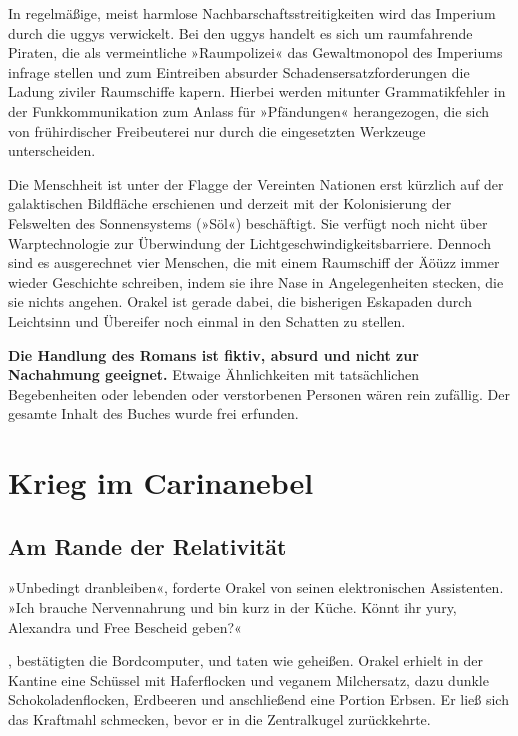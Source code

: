 In regelmäßige, meist harmlose Nachbarschaftsstreitigkeiten wird das Imperium durch die uggys verwickelt. Bei den uggys handelt es sich um raumfahrende Piraten, die als vermeintliche »Raumpolizei« das Gewaltmonopol des Imperiums infrage stellen und zum Eintreiben absurder Schadensersatzforderungen die Ladung ziviler Raumschiffe kapern. Hierbei werden mitunter Grammatikfehler in der Funkkommunikation zum Anlass für »Pfändungen« herangezogen, die sich von frühirdischer Freibeuterei nur durch die eingesetzten Werkzeuge unterscheiden.

Die Menschheit ist unter der Flagge der Vereinten Nationen erst kürzlich auf der galaktischen Bildfläche erschienen und derzeit mit der Kolonisierung der Felswelten des Sonnensystems (»Söl«) beschäftigt. Sie verfügt noch nicht über Warptechnologie zur Überwindung der Lichtgeschwindigkeitsbarriere. Dennoch sind es ausgerechnet vier Menschen, die mit einem Raumschiff der Äöüzz immer wieder Geschichte schreiben, indem sie ihre Nase in Angelegenheiten stecken, die sie nichts angehen. Orakel ist gerade dabei, die bisherigen Eskapaden durch Leichtsinn und Übereifer noch einmal in den Schatten zu stellen.

\bigskip

\noindent \textbf{Die Handlung des Romans ist fiktiv, absurd und nicht zur Nachahmung geeignet.} Etwaige Ähnlichkeiten mit tatsächlichen Begebenheiten oder lebenden oder verstorbenen Personen wären rein zufällig. Der gesamte Inhalt des Buches wurde frei erfunden.

\newpage

\part{Krieg im Carinanebel}

\chapter{Am Rande der Relativität}

»Unbedingt dranbleiben«, forderte Orakel von seinen elektronischen Assistenten. »Ich brauche Nervennahrung und bin kurz in der Küche. Könnt ihr yury, Alexandra und Free Bescheid geben?«

, bestätigten die Bordcomputer, und taten wie geheißen. Orakel erhielt in der Kantine eine Schüssel mit Haferflocken und veganem Milchersatz, dazu dunkle Schokoladenflocken, Erdbeeren und anschließend eine Portion Erbsen. Er ließ sich das Kraftmahl schmecken, bevor er in die Zentralkugel zurückkehrte.

